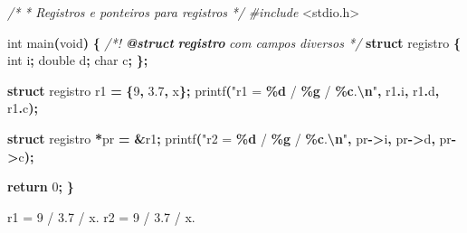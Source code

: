 \documentclass[
  11pt,
  a4paper,
]{scrbook}
\newenvironment{Shaded}{\begin{snugshade}}{\end{snugshade}}
\newcommand{\AnnotationTok}[1]{\textcolor[rgb]{0.56,0.35,0.01}{\textbf{\textit{#1}}}}
\newcommand{\CharTok}[1]{\textcolor[rgb]{0.31,0.60,0.02}{#1}}
\newcommand{\CommentTok}[1]{\textcolor[rgb]{0.56,0.35,0.01}{\textit{#1}}}
\newcommand{\CommentVarTok}[1]{\textcolor[rgb]{0.56,0.35,0.01}{\textbf{\textit{#1}}}}
\newcommand{\ControlFlowTok}[1]{\textcolor[rgb]{0.13,0.29,0.53}{\textbf{#1}}}
\newcommand{\DataTypeTok}[1]{\textcolor[rgb]{0.13,0.29,0.53}{#1}}
\newcommand{\DecValTok}[1]{\textcolor[rgb]{0.00,0.00,0.81}{#1}}
\newcommand{\FloatTok}[1]{\textcolor[rgb]{0.00,0.00,0.81}{#1}}
\newcommand{\ImportTok}[1]{#1}
\newcommand{\KeywordTok}[1]{\textcolor[rgb]{0.13,0.29,0.53}{\textbf{#1}}}
\newcommand{\NormalTok}[1]{#1}
\newcommand{\OperatorTok}[1]{\textcolor[rgb]{0.81,0.36,0.00}{\textbf{#1}}}
\newcommand{\PreprocessorTok}[1]{\textcolor[rgb]{0.56,0.35,0.01}{\textit{#1}}}
\newcommand{\SpecialCharTok}[1]{\textcolor[rgb]{0.81,0.36,0.00}{\textbf{#1}}}
\newcommand{\StringTok}[1]{\textcolor[rgb]{0.31,0.60,0.02}{#1}}
\begin{document}
\begin{Shaded}
\begin{Highlighting}[]
\CommentTok{/*}
\CommentTok{ * Registros e ponteiros para registros}
\CommentTok{ */}
\PreprocessorTok{\#include }\ImportTok{\textless{}stdio.h\textgreater{}}

\DataTypeTok{int}\NormalTok{ main}\OperatorTok{(}\DataTypeTok{void}\OperatorTok{)} \OperatorTok{\{}
    \CommentTok{/*! }\AnnotationTok{@struct}\CommentTok{ }\CommentVarTok{registro}\CommentTok{ com campos diversos */}
    \KeywordTok{struct}\NormalTok{ registro }\OperatorTok{\{}
        \DataTypeTok{int}\NormalTok{ i}\OperatorTok{;}
        \DataTypeTok{double}\NormalTok{ d}\OperatorTok{;}
        \DataTypeTok{char}\NormalTok{ c}\OperatorTok{;}
    \OperatorTok{\};}

    \KeywordTok{struct}\NormalTok{ registro r1 }\OperatorTok{=} \OperatorTok{\{}\DecValTok{9}\OperatorTok{,} \FloatTok{3.7}\OperatorTok{,} \CharTok{\textquotesingle{}x\textquotesingle{}}\OperatorTok{\};}
\NormalTok{    printf}\OperatorTok{(}\StringTok{"r1 = }\SpecialCharTok{\%d}\StringTok{ / }\SpecialCharTok{\%g}\StringTok{ / \textquotesingle{}}\SpecialCharTok{\%c}\StringTok{\textquotesingle{}.}\SpecialCharTok{\textbackslash{}n}\StringTok{"}\OperatorTok{,}\NormalTok{ r1}\OperatorTok{.}\NormalTok{i}\OperatorTok{,}\NormalTok{ r1}\OperatorTok{.}\NormalTok{d}\OperatorTok{,}\NormalTok{ r1}\OperatorTok{.}\NormalTok{c}\OperatorTok{);}

    \KeywordTok{struct}\NormalTok{ registro }\OperatorTok{*}\NormalTok{pr }\OperatorTok{=} \OperatorTok{\&}\NormalTok{r1}\OperatorTok{;}
\NormalTok{    printf}\OperatorTok{(}\StringTok{"r2 = }\SpecialCharTok{\%d}\StringTok{ / }\SpecialCharTok{\%g}\StringTok{ / \textquotesingle{}}\SpecialCharTok{\%c}\StringTok{\textquotesingle{}.}\SpecialCharTok{\textbackslash{}n}\StringTok{"}\OperatorTok{,}\NormalTok{ pr}\OperatorTok{{-}\textgreater{}}\NormalTok{i}\OperatorTok{,}\NormalTok{ pr}\OperatorTok{{-}\textgreater{}}\NormalTok{d}\OperatorTok{,}\NormalTok{ pr}\OperatorTok{{-}\textgreater{}}\NormalTok{c}\OperatorTok{);}

    \ControlFlowTok{return} \DecValTok{0}\OperatorTok{;}
\OperatorTok{\}}
\end{Highlighting}
\end{Shaded}

\begin{Shaded}
\begin{Highlighting}[]
\NormalTok{r1 = 9 / 3.7 / \textquotesingle{}x\textquotesingle{}.}
\NormalTok{r2 = 9 / 3.7 / \textquotesingle{}x\textquotesingle{}.}
\end{Highlighting}
\end{Shaded}
\end{document}
